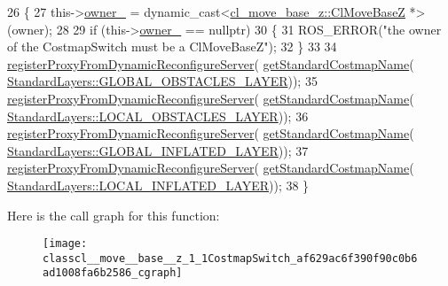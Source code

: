 \begin{DoxyCode}
26 \{
27     this->\hyperlink{classcl__move__base__z_1_1CostmapSwitch_a42a7da3f7301daa691ef1593ae926618}{owner\_} = \textcolor{keyword}{dynamic\_cast<}\hyperlink{classcl__move__base__z_1_1ClMoveBaseZ}{cl\_move\_base\_z::ClMoveBaseZ} *\textcolor{keyword}{>}(owner);
28 
29     \textcolor{keywordflow}{if} (this->\hyperlink{classcl__move__base__z_1_1CostmapSwitch_a42a7da3f7301daa691ef1593ae926618}{owner\_} == \textcolor{keyword}{nullptr})
30     \{
31         ROS\_ERROR(\textcolor{stringliteral}{"the owner of the CostmapSwitch must be a ClMoveBaseZ"});
32     \}
33 
34     \hyperlink{classcl__move__base__z_1_1CostmapSwitch_a0d04ca7b655f850ba3107393f1c437cb}{registerProxyFromDynamicReconfigureServer}(
      \hyperlink{classcl__move__base__z_1_1CostmapSwitch_ac46796874242fdaa7efef86b66a55102}{getStandardCostmapName}(
      \hyperlink{classcl__move__base__z_1_1CostmapSwitch_af38aeee5e3893e689cd74ddddfe0df15a94404229e09ab748aab0096bd5ff3656}{StandardLayers::GLOBAL\_OBSTACLES\_LAYER}));
35     \hyperlink{classcl__move__base__z_1_1CostmapSwitch_a0d04ca7b655f850ba3107393f1c437cb}{registerProxyFromDynamicReconfigureServer}(
      \hyperlink{classcl__move__base__z_1_1CostmapSwitch_ac46796874242fdaa7efef86b66a55102}{getStandardCostmapName}(
      \hyperlink{classcl__move__base__z_1_1CostmapSwitch_af38aeee5e3893e689cd74ddddfe0df15aff8d30cf6ceac8551691e28c328aebe6}{StandardLayers::LOCAL\_OBSTACLES\_LAYER}));
36     \hyperlink{classcl__move__base__z_1_1CostmapSwitch_a0d04ca7b655f850ba3107393f1c437cb}{registerProxyFromDynamicReconfigureServer}(
      \hyperlink{classcl__move__base__z_1_1CostmapSwitch_ac46796874242fdaa7efef86b66a55102}{getStandardCostmapName}(
      \hyperlink{classcl__move__base__z_1_1CostmapSwitch_af38aeee5e3893e689cd74ddddfe0df15a1757575ee674622adfb325de182a65d6}{StandardLayers::GLOBAL\_INFLATED\_LAYER}));
37     \hyperlink{classcl__move__base__z_1_1CostmapSwitch_a0d04ca7b655f850ba3107393f1c437cb}{registerProxyFromDynamicReconfigureServer}(
      \hyperlink{classcl__move__base__z_1_1CostmapSwitch_ac46796874242fdaa7efef86b66a55102}{getStandardCostmapName}(
      \hyperlink{classcl__move__base__z_1_1CostmapSwitch_af38aeee5e3893e689cd74ddddfe0df15aab9e94e9dc4c62e74e48ee34b11c8807}{StandardLayers::LOCAL\_INFLATED\_LAYER}));
38 \}
\end{DoxyCode}


Here is the call graph for this function\+:
\nopagebreak
\begin{figure}[H]
\begin{center}
\leavevmode
\texttt{[image: classcl\_\_move\_\_base\_\_z\_1\_1CostmapSwitch\_af629ac6f390f90c0b6ad1008fa6b2586\_cgraph]}
\end{center}
\end{figure}


